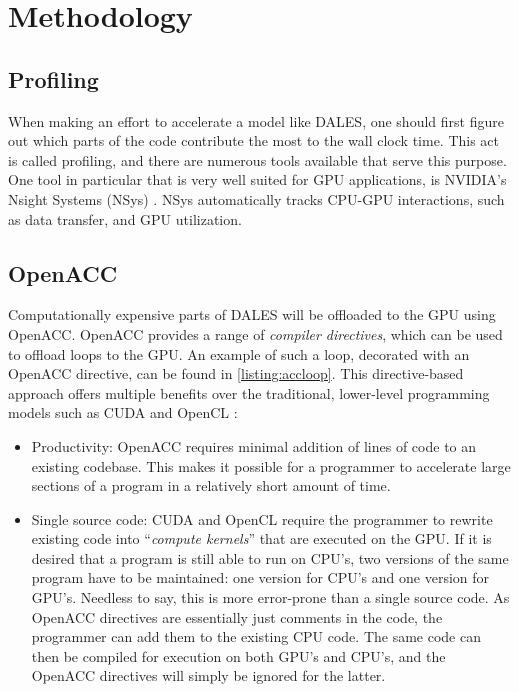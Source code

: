 \section{Methodology}

\subsection{Profiling}
When making an effort to accelerate a model like DALES, one should first figure out which parts of the code contribute the most to the wall clock time. This act is called profiling, and there are numerous tools available that serve this purpose. One tool in particular that is very well suited for GPU applications, is NVIDIA's Nsight Systems (NSys) \citep{nvidiaNVIDIANsightSystems}. NSys automatically tracks CPU-GPU interactions, such as data transfer, and GPU utilization. 

\subsection{OpenACC}
Computationally expensive parts of DALES will be offloaded to the GPU using OpenACC. OpenACC provides a range of \emph{compiler directives}, which can be used to offload loops to the GPU. An example of such a loop, decorated with an OpenACC directive, can be found in \autoref{listing:accloop}. This directive-based approach offers multiple benefits over the traditional, lower-level programming models such as CUDA and OpenCL \citep{herdmanAcceleratingHydrocodesOpenACC2012}:

\begin{itemize}
    \item Productivity: OpenACC requires minimal addition of lines of code to an existing codebase. This makes it possible for a programmer to accelerate large sections of a program in a relatively short amount of time. 
    \item Single source code: CUDA and OpenCL require the programmer to rewrite existing code into ``\emph{compute kernels}'' that are executed on the GPU. If it is desired that a program is still able to run on CPU's, two versions of the same program have to be maintained: one version for CPU's and one version for GPU's. Needless to say, this is more error-prone than a single source code. As OpenACC directives are essentially just comments in the code, the programmer can add them to the existing CPU code. The same code can then be compiled for execution on both GPU's and CPU's, and the OpenACC directives will simply be ignored for the latter.
\end{itemize}

